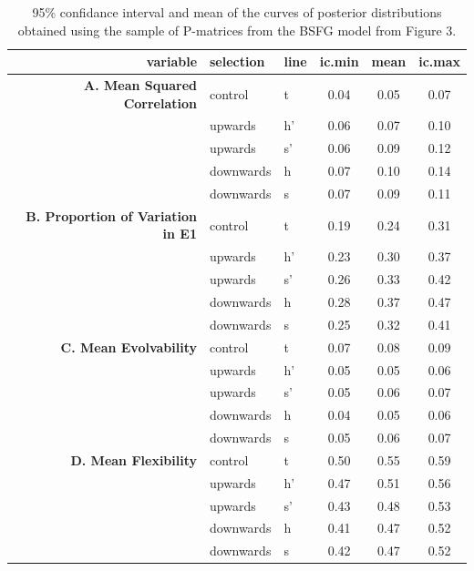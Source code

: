 \begin{refsection}
\begin{table}
\centering
\caption{95\% confidance interval and mean of the curves of posterior distributions obtained using the sample of P-matrices from the BSFG model from Figure 3.}
\begin{tabular}{rllccc}
  \hline
variable & selection & line & ic.min & mean & ic.max \\
  \hline
\textbf{A. Mean Squared Correlation} & control & t & 0.04 & 0.05 & 0.07 \\
   & upwards & h' & 0.06 & 0.07 & 0.10 \\
   & upwards & s' & 0.06 & 0.09 & 0.12 \\
   & downwards & h & 0.07 & 0.10 & 0.14 \\
   & downwards & s & 0.07 & 0.09 & 0.11 \\
\textbf{B. Proportion of Variation in E1} & control & t & 0.19 & 0.24 & 0.31 \\
   & upwards & h' & 0.23 & 0.30 & 0.37 \\
   & upwards & s' & 0.26 & 0.33 & 0.42 \\
   & downwards & h & 0.28 & 0.37 & 0.47 \\
   & downwards & s & 0.25 & 0.32 & 0.41 \\
\textbf{C. Mean Evolvability} & control & t & 0.07 & 0.08 & 0.09 \\
   & upwards & h' & 0.05 & 0.05 & 0.06 \\
   & upwards & s' & 0.05 & 0.06 & 0.07 \\
   & downwards & h & 0.04 & 0.05 & 0.06 \\
   & downwards & s & 0.05 & 0.06 & 0.07 \\
\textbf{D. Mean Flexibility} & control & t & 0.50 & 0.55 & 0.59 \\
   & upwards & h' & 0.47 & 0.51 & 0.56 \\
   & upwards & s' & 0.43 & 0.48 & 0.53 \\
   & downwards & h & 0.41 & 0.47 & 0.52 \\
   & downwards & s & 0.42 & 0.47 & 0.52 \\
  

   \hline
\end{tabular}
\end{table}


\end{refsection}
